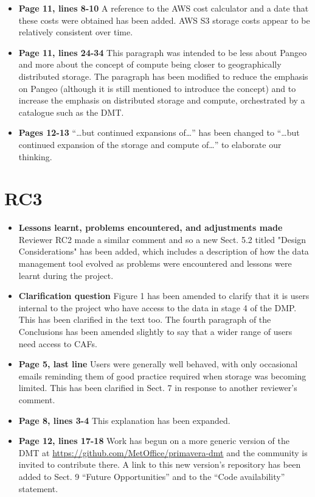 \documentclass[12pt,a4paper]{article}
\begin{document}
\begin{itemize}
\item \textbf{Page 11, lines 8-10} A reference to the AWS cost calculator and a date that these costs were obtained has been added. AWS S3 storage costs appear to be relatively consistent over time.

\item \textbf{Page 11, lines 24-34} This paragraph was intended to be less about Pangeo and more about the concept of compute being closer to geographically distributed storage. The paragraph has been modified to reduce the emphasis on Pangeo (although it is still mentioned to introduce the concept) and to increase the emphasis on distributed storage and compute, orchestrated by a catalogue such as the DMT.

\item \textbf{Pages 12-13} ``\ldots but continued expansions of\ldots'' has been changed to ``\ldots but continued expansion of the storage and compute of\dots'' to elaborate our thinking.

\end{itemize}

\section{RC3}

\begin{itemize}
\item \textbf{Lessons learnt, problems encountered, and adjustments made} Reviewer RC2 made a similar comment and so a new Sect. 5.2 titled "Design Considerations" has been added, which includes a description of how the data management tool evolved as problems were encountered and lessons were learnt during the project.

\item \textbf{Clarification question} Figure 1 has been amended to clarify that it is users internal to the project who have access to the data in stage 4 of the DMP. This has been clarified in the text too. The fourth paragraph of the Conclusions has been amended slightly to say that a wider range of users need access to CAFs.

\item \textbf{Page 5, last line} Users were generally well behaved, with only occasional emails reminding them of good practice required when storage was becoming limited. This has been clarified in Sect. 7 in response to another reviewer's comment.

\item \textbf{Page 8, lines 3-4} This explanation has been expanded.

\item \textbf{Page 12, lines 17-18} Work has begun on a more generic version of the DMT at \url{https://github.com/MetOffice/primavera-dmt} and the community is invited to contribute there. A link to this new version's repository has been added to Sect. 9 ``Future Opportunities'' and to the ``Code availability'' statement.

\end{itemize}
\end{document}
